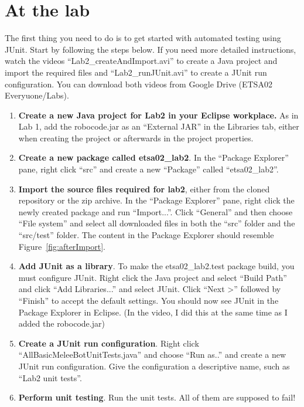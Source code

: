 \documentclass{scrreprt}
\begin{document}
\chapter{At the lab}
The first thing you need to do is to get started with automated testing using JUnit. Start by following the steps below. If you need more detailed instructions, watch the videos ``Lab2_createAndImport.avi'' to create a Java project and import the required files and ``Lab2_runJUnit.avi'' to create a JUnit run configuration. You can download both videos from Google Drive (ETSA02 Everyuone/Labs).
\begin{enumerate}
\item \textbf{Create a new Java project for Lab2 in your Eclipse workplace.} As in Lab 1, add the robocode.jar as an ``External JAR'' in the Libraries tab, either when creating the project or afterwards in the project properties.
\item \textbf{Create a new package called etsa02_lab2}. In the ``Package Explorer'' pane, right click ``src'' and create a new ``Package'' called ``etsa02_lab2''.
\item \textbf{Import the source files required for lab2}, either from the cloned repository or the zip archive. In the ``Package Explorer'' pane, right click the newly created package and run ``Import...''. Click ``General'' and then choose ``File system'' and select all downloaded files in both the ``src'' folder and the ``src/test'' folder. The content in the Package Explorer should resemble Figure~\ref{fig:afterImport}.
\item \textbf{Add JUnit as a library}. To make the etsa02_lab2.test package build, you must configure JUnit. Right click the Java project and select ``Build Path'' and click ``Add Libraries...'' and select JUnit. Click ``Next >'' followed by ``Finish'' to accept the default settings. You should now see JUnit in the Package Explorer in Eclipse. (In the video, I did this at the same time as I added the robocode.jar)
\item \textbf{Create a JUnit run configuration}. Right click ``AllBasicMeleeBotUnitTests.java'' and choose ``Run as..'' and create a new JUnit run configuration. Give the configuration a descriptive name, such as ``Lab2 unit tests''.
\item \textbf{Perform unit testing}. Run the unit tests. All of them are supposed to fail!
\end{enumerate}
\end{document}
